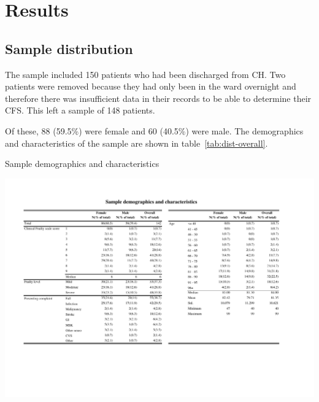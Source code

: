 \documentclass
[
	12pt,
	a4paper,
	oneside,
]{report}
\begin{document}
% 
%


\chapter{Results}

\section{Sample distribution}

The sample included 150 patients who had been discharged from CH. Two patients
were removed because they had only been in the ward overnight and therefore
there was insufficient data in their records to be able to determine their
CFS. This left a sample of 148 patients. 

Of these, 88 (59.5\%) were female and 60 (40.5\%) were male. The demographics 
and characteristics of the sample are shown in table~\ref{tab:dist-overall}.

\begin{table}[p]
\caption{Sample demographics and characteristics}
\label{tab:dist-overall}
\includegraphics[width=\textwidth,
	trim={1.5cm 4cm 2.5cm 2cm},
	clip,
	angle=90,
	scale=1.45]{media/dist-overall}
\end{table}
\end{document}
